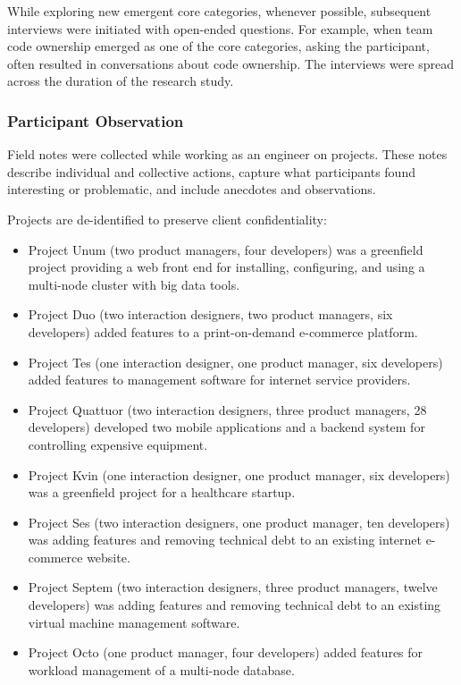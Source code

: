 While exploring new emergent core categories, whenever possible, subsequent interviews were initiated with open-ended questions.  For example, when team code ownership emerged as one of the core categories, asking the participant,  often resulted in conversations about code ownership. The interviews were spread across the duration of the research study. 


\subsubsection{Participant Observation}
Field notes were collected while working as an engineer on \numberOfObservedProjects{} projects. These notes describe individual and collective actions, capture what participants found interesting or problematic, and include anecdotes and observations.

Projects are de-identified to preserve client confidentiality:
\begin{itemize}
\item Project Unum (two product managers, four developers) was a greenfield project providing a web front end for installing, configuring, and using a multi-node cluster with big data tools. 
\item Project Duo (two interaction designers, two product managers, six developers) added features to a print-on-demand e-commerce platform. 
\item Project Tes (one interaction designer, one product manager, six developers) added features to management software for internet service providers.
\item Project Quattuor (two interaction designers, three product managers, 28 developers) developed two mobile applications and a backend system for controlling expensive equipment.
\item Project Kvin (one interaction designer, one product manager, six developers) was a greenfield project for a healthcare startup. 
\item Project Ses (two interaction designers, one product manager, ten developers) was adding features and removing technical debt to an existing internet e-commerce website.
\item Project Septem (two interaction designers, three product managers, twelve developers) was adding features and removing technical debt to an existing virtual machine management software.
\item Project Octo (one product manager, four developers) added features for workload management of a multi-node database.
\end{itemize}



